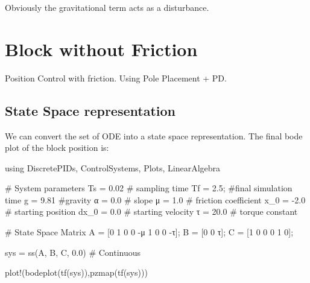 \documentclass[
  a4paper,
  DIV=11,
  numbers=noendperiod]{scrreprt}
\newenvironment{Shaded}{\begin{snugshade}}{\end{snugshade}}
\newcommand{\BuiltInTok}[1]{\textcolor[rgb]{0.00,0.23,0.31}{#1}}
\newcommand{\CommentTok}[1]{\textcolor[rgb]{0.37,0.37,0.37}{#1}}
\newcommand{\FloatTok}[1]{\textcolor[rgb]{0.68,0.00,0.00}{#1}}
\newcommand{\FunctionTok}[1]{\textcolor[rgb]{0.28,0.35,0.67}{#1}}
\newcommand{\ImportTok}[1]{\textcolor[rgb]{0.00,0.46,0.62}{#1}}
\newcommand{\NormalTok}[1]{\textcolor[rgb]{0.00,0.23,0.31}{#1}}
\newcommand{\OperatorTok}[1]{\textcolor[rgb]{0.37,0.37,0.37}{#1}}
\begin{document}
Obviously the gravitational term acts as a disturbance.

\chapter{Block without Friction}\label{block-without-friction}

Position Control with friction. Using Pole Placement + PD.

\hfill\break

\section{State Space representation}\label{state-space-representation}

We can convert the set of ODE into a state space representation. The
final bode plot of the block position is:

\begin{Shaded}
\begin{Highlighting}[]
\ImportTok{using} \BuiltInTok{DiscretePIDs}\NormalTok{, }\BuiltInTok{ControlSystems}\NormalTok{, }\BuiltInTok{Plots}\NormalTok{, }\BuiltInTok{LinearAlgebra}

\CommentTok{\# System parameters}
\NormalTok{Ts }\OperatorTok{=} \FloatTok{0.02} \CommentTok{\# sampling time}
\NormalTok{Tf }\OperatorTok{=} \FloatTok{2.5}\NormalTok{; }\CommentTok{\#final simulation time}
\NormalTok{g }\OperatorTok{=} \FloatTok{9.81} \CommentTok{\#gravity}
\NormalTok{α }\OperatorTok{=} \FloatTok{0.0} \CommentTok{\# slope}
\NormalTok{μ }\OperatorTok{=} \FloatTok{1.0} \CommentTok{\# friction coefficient}
\NormalTok{x\_0 }\OperatorTok{=} \OperatorTok{{-}}\FloatTok{2.0} \CommentTok{\# starting position}
\NormalTok{dx\_0 }\OperatorTok{=} \FloatTok{0.0} \CommentTok{\# starting velocity}
\NormalTok{τ }\OperatorTok{=} \FloatTok{20.0} \CommentTok{\# torque constant }

\CommentTok{\# State Space Matrix}
\NormalTok{A }\OperatorTok{=}\NormalTok{ [}\FloatTok{0} \FloatTok{1} \FloatTok{0}
    \FloatTok{0} \OperatorTok{{-}}\NormalTok{μ }\FloatTok{1}
    \FloatTok{0} \FloatTok{0} \OperatorTok{{-}}\NormalTok{τ];}
\NormalTok{B }\OperatorTok{=}\NormalTok{ [}\FloatTok{0}
    \FloatTok{0}
\NormalTok{    τ];}
\NormalTok{C }\OperatorTok{=}\NormalTok{ [}\FloatTok{1} \FloatTok{0} \FloatTok{0}
    \FloatTok{0} \FloatTok{1} \FloatTok{0}\NormalTok{];}

\NormalTok{sys }\OperatorTok{=} \FunctionTok{ss}\NormalTok{(A, B, C, }\FloatTok{0.0}\NormalTok{)      }\CommentTok{\# Continuous}

\FunctionTok{plot!}\NormalTok{(}\FunctionTok{bodeplot}\NormalTok{(}\FunctionTok{tf}\NormalTok{(sys)),}\FunctionTok{pzmap}\NormalTok{(}\FunctionTok{tf}\NormalTok{(sys)))}
\end{Highlighting}
\end{Shaded}
\end{document}
